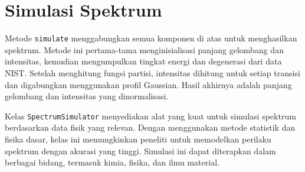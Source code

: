 \section{Simulasi Spektrum}
\par Metode \texttt{simulate} menggabungkan semua komponen di atas untuk menghasilkan spektrum. Metode ini pertama-tama menginisialisasi panjang gelombang dan intensitas, kemudian mengumpulkan tingkat energi dan degenerasi dari data NIST. Setelah menghitung fungsi partisi, intensitas dihitung untuk setiap transisi dan digabungkan menggunakan profil Gaussian. Hasil akhirnya adalah panjang gelombang dan intensitas yang dinormalisasi.

\par Kelas \texttt{SpectrumSimulator} menyediakan alat yang kuat untuk simulasi spektrum berdasarkan data fisik yang relevan. Dengan menggunakan metode statistik dan fisika dasar, kelas ini memungkinkan peneliti untuk memodelkan perilaku spektrum dengan akurasi yang tinggi. Simulasi ini dapat diterapkan dalam berbagai bidang, termasuk kimia, fisika, dan ilmu material.
